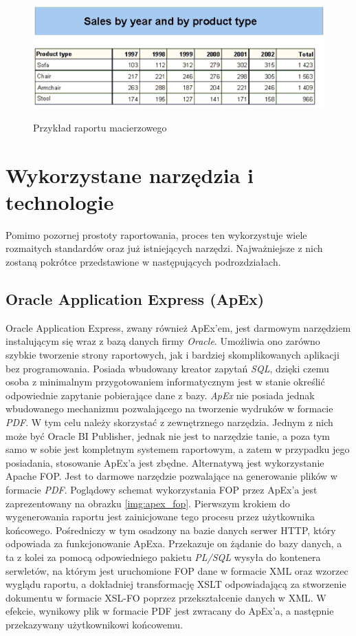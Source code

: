 \documentclass[11pt,a4paper]{article}
\begin{document}
\begin{figure}[h]
\centering
\caption{Przykład raportu macierzowego}
\includegraphics[scale=1]{crosstab_report}
\label{img:ct}
\end{figure}

\newpage

\section{Wykorzystane narzędzia i technologie} \label{sec:tools}
Pomimo pozornej prostoty raportowania, proces ten wykorzystuje wiele rozmaitych standardów oraz już istniejących narzędzi. Najważniejsze z nich zostaną pokrótce przedstawione w następujących podrozdziałach.

\subsection{Oracle Application Express (ApEx)} \label{tools:apex}
Oracle Application Express, zwany również ApEx'em, jest darmowym narzędziem instalującym się wraz z bazą danych firmy \emph{Oracle}. Umożliwia ono zarówno szybkie tworzenie strony raportowych, jak i bardziej skomplikowanych aplikacji bez programowania. Posiada wbudowany kreator zapytań \emph{SQL}, dzięki czemu osoba z minimalnym przygotowaniem informatycznym jest w stanie określić odpowiednie zapytanie pobierające dane z bazy. \emph{ApEx} nie posiada jednak wbudowanego mechanizmu pozwalającego na tworzenie wydruków w formacie \emph{PDF}. W tym celu należy skorzystać z zewnętrznego narzędzia. Jednym z nich może być Oracle BI Publisher, jednak nie jest to narzędzie tanie, a poza tym samo w sobie jest kompletnym systemem raportowym, a zatem w przypadku jego posiadania, stosowanie ApEx'a jest zbędne. Alternatywą jest wykorzystanie Apache FOP. Jest to darmowe narzędzie pozwalające na generowanie plików w formacie \emph{PDF}. Poglądowy schemat wykorzystania FOP przez ApEx'a jest zaprezentowany na obrazku 
\ref{img:apex_fop}. Pierwszym krokiem do wygenerowania raportu jest zainicjowane tego procesu przez użytkownika końcowego. Pośredniczy w tym osadzony na bazie danych serwer HTTP, który odpowiada za funkcjonowanie ApExa. Przekazuje on żądanie do bazy danych, a ta z kolei za pomocą odpowiedniego pakietu \emph{PL/SQL} wysyła do kontenera serwletów, na którym jest uruchomione FOP dane w formacie XML oraz wzorzec wyglądu raportu, a dokładniej transformację XSLT odpowiadającą za stworzenie dokumentu w formacie XSL-FO poprzez przekształcenie danych w XML. W efekcie, wynikowy plik w formacie PDF jest zwracany do ApEx'a, a następnie przekazywany użytkownikowi końcowemu. 
\end{document}
